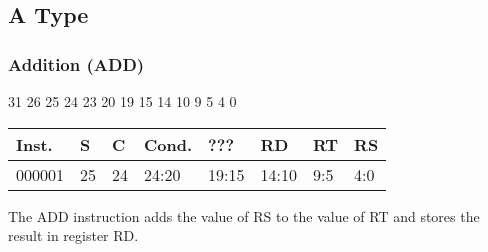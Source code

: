 \documentclass[12pt]{article}
\begin{document}
\subsection{A Type}



    
    \subsubsection{Addition (ADD)}
    
    \hspace{1.6cm}31 \hspace{1.2cm}26 \hspace{.075cm}25 \hspace{.15cm}24 \hspace{.075cm}23 \hspace{.875cm}20 \hspace{.04cm}19 \hspace{.8cm}15 \hspace{.04cm}14 \hspace{.8cm}10 \hspace{.04cm}9 \hspace{1.15cm}5 \hspace{.04cm}4 \hspace{1.25cm}0
    \vspace{-.25cm}
    \begin{center}
        \begin{tabular}{ |p{1.8cm}|p{.3cm}|p{.3cm}|p{1.5cm}|p{1.5cm}|p{1.5cm}|p{1.5cm}|p{1.5cm}| }
            \hline
            \textbf{Inst.} & \textbf{S}& \textbf{C} & \textbf{Cond.} & ??? & \textbf{RD} & \textbf{RT} & \textbf{RS}\\
            \hline
            000001& 25 & 24 & 24:20 & 19:15 & 14:10 & 9:5 & 4:0\\
            \hline
        \end{tabular}
    \end{center}
    
    \noindent
    The ADD instruction adds the value of RS to the value of RT and stores the result in register RD. 
    
\end{document}
